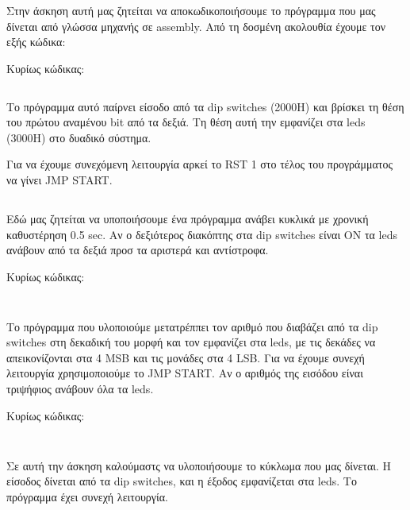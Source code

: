 \documentclass[a4paper,10pt]{article}
\begin{document}
\def\thesubsection {Άσκηση (\roman{subsection})}



\section*{} 
\subsection{}

Στην άσκηση αυτή μας ζητείται να αποκωδικοποιήσουμε το πρόγραμμα που μας
δίνεται από γλώσσα μηχανής σε assembly. Από τη δοσμένη ακολουθία έχουμε τον
εξής κώδικα:

\noindent Κυρίως κώδικας:
\inputminted[linenos,obeytabs,fontsize=\footnotesize]{nasm}{files/1-1.8085}

Το πρόγραμμα αυτό παίρνει είσοδο από τα dip switches (2000H) και βρίσκει τη
θέση του πρώτου αναμένου bit από τα δεξιά. Τη θέση αυτή την εμφανίζει στα leds
(3000H) στο δυαδικό σύστημα. 

Για να έχουμε συνεχόμενη λειτουργία αρκεί το RST 1 στο τέλος του προγράμματος
να γίνει JMP START.

\subsection{}

Εδώ μας ζητείται να υποποιήσουμε ένα πρόγραμμα ανάβει κυκλικά με χρονική
καθυστέρηση 0.5 sec. Αν ο δεξιότερος διακόπτης στα dip switches είναι ON τα 
leds ανάβουν από τα δεξιά προσ τα αριστερά και αντίστροφα. 

\noindent Κυρίως κώδικας:
\inputminted[linenos,obeytabs,fontsize=\footnotesize]{nasm}{files/1-2.8085}

\subsection{}

Το πρόγραμμα που υλοποιούμε μετατρέππει τον αριθμό που διαβάζει από τα dip
switches στη δεκαδική του μορφή και τον εμφανίζει στα leds, με τις δεκάδες να
απεικονίζονται στα 4 MSB και τις μονάδες στα 4 LSB.  Για να έχουμε συνεχή
λειτουργία χρησιμοποιούμε το JMP START. Αν ο αριθμός της εισόδου είναι
τριψήφιος ανάβουν όλα τα leds.

\noindent Κυρίως κώδικας:
\inputminted[linenos,obeytabs,fontsize=\footnotesize]{nasm}{files/1-3.8085}

\subsection{}
Σε αυτή την άσκηση καλούμαστς να υλοποιήσουμε το κύκλωμα που μας δίνεται. Η
είσοδος δίνεται από τα dip switches, και η έξοδος εμφανίζεται στα leds. Το
πρόγραμμα έχει συνεχή λειτουργία.
\end{document}
